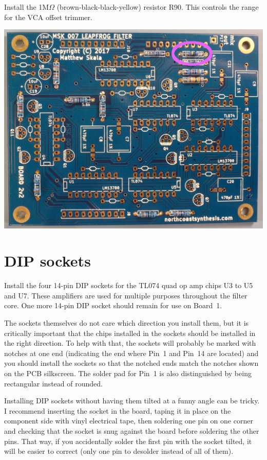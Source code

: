 Install the 1M$\Omega$ (brown-black-black-yellow) resistor R90.  This
controls the range for the VCA offset trimmer.

\nopagebreak \noindent\includegraphics[width=\linewidth]{res-1m2.jpg}

\section{DIP sockets}

Install the four 14-pin DIP sockets for the TL074 quad op amp chips U3 to U5
and U7.  These amplifiers are used for multiple purposes throughout the
filter core.  One more 14-pin DIP socket should remain for use on Board~1.

The sockets\label{pag:dip-sockets} themselves do not care which direction
you install them, but it is critically important that the chips installed in
the sockets should be installed in the right direction.  To help with that,
the sockets will probably be marked with notches at one end (indicating the
end where Pin~1 and Pin~14 are located) and you should install the sockets
so that the notched ends match the notches shown on the PCB silkscreen.  The
solder pad for Pin~1 is also distinguished by being rectangular instead of
rounded.

Installing DIP sockets without having them tilted at a funny angle can be
tricky.  I recommend inserting the socket in the board, taping it in place
on the component side with vinyl electrical tape, then soldering one pin on
one corner and checking that the socket is snug against the board before
soldering the other pins.  That way, if you accidentally solder the first
pin with the socket tilted, it will be easier to correct (only one pin to
desolder instead of all of them).

